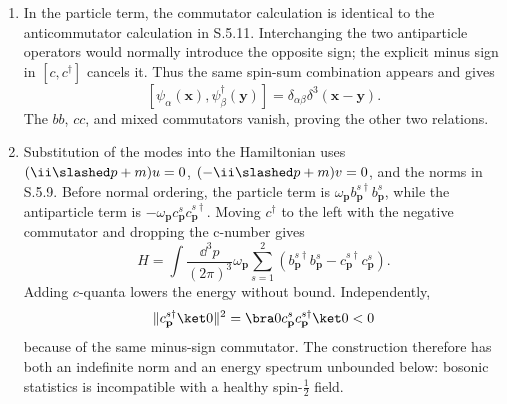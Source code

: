 \begin{enumerate}
\begin{enumerate}
\item
In the particle term, the commutator calculation is identical to the
anticommutator calculation in S.5.11.  Interchanging the two
antiparticle operators would normally introduce the opposite sign; the
explicit minus sign in
\([c,c^\dagger]\) cancels it.  Thus the same spin-sum combination
appears and gives
\[
 [\psi_\alpha(\mathbf x),\psi_\beta^\dagger(\mathbf y)]
 =\delta_{\alpha\beta}\delta^3(\mathbf x-\mathbf y).
\]
The \(bb\), \(cc\), and mixed commutators vanish, proving the other two
relations.
\item
Substitution of the modes into the Hamiltonian uses
\((\ii\slashed p+m)u=0\),
\((-\ii\slashed p+m)v=0\), and the norms in S.5.9.  Before normal ordering,
the particle term is \(\omega_{\mathbf p}b_{\mathbf p}^{s\dagger}
b_{\mathbf p}^s\), while the antiparticle term is
\(-\omega_{\mathbf p}c_{\mathbf p}^sc_{\mathbf p}^{s\dagger}\).  Moving
\(c^\dagger\) to the left with the negative commutator and dropping the
c-number gives
\[
 H=\int\frac{\dd^3p}{(2\pi)^3}\omega_{\mathbf p}
 \sum_{s=1}^2
 \left(b_{\mathbf p}^{s\dagger}b_{\mathbf p}^s
 -c_{\mathbf p}^{s\dagger}c_{\mathbf p}^s\right).
\]
Adding \(c\)-quanta lowers the energy without bound.  Independently,
\[
 \|c_{\mathbf p}^{s\dagger}\ket0\|^2
 =\bra0c_{\mathbf p}^sc_{\mathbf p}^{s\dagger}\ket0<0
\]
because of the same minus-sign commutator.  The construction therefore
has both an indefinite norm and an energy spectrum unbounded below:
bosonic statistics is incompatible with a healthy spin-\(\tfrac12\)
field.
\end{enumerate}


\end{enumerate}
